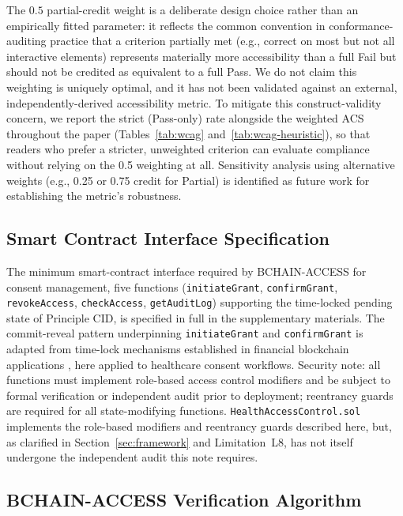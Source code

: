 \documentclass[journal,onecolumn]{IEEEtran}
\begin{document}
The $0.5$ partial-credit weight is a deliberate design choice rather than an empirically fitted parameter: it reflects the common convention in conformance-auditing practice that a criterion partially met (e.g., correct on most but not all interactive elements) represents materially more accessibility than a full Fail but should not be credited as equivalent to a full Pass. We do not claim this weighting is uniquely optimal, and it has not been validated against an external, independently-derived accessibility metric. To mitigate this construct-validity concern, we report the strict (Pass-only) rate alongside the weighted ACS throughout the paper (Tables~\ref{tab:wcag} and~\ref{tab:wcag-heuristic}), so that readers who prefer a stricter, unweighted criterion can evaluate compliance without relying on the 0.5 weighting at all. Sensitivity analysis using alternative weights (e.g., 0.25 or 0.75 credit for Partial) is identified as future work for establishing the metric's robustness.


\subsection{Smart Contract Interface Specification}

The minimum smart-contract interface required by BCHAIN-ACCESS for consent management, five functions (\texttt{initiateGrant}, \texttt{confirmGrant}, \texttt{revokeAccess}, \texttt{checkAccess}, \texttt{getAuditLog}) supporting the time-locked pending state of Principle CID, is specified in full in the supplementary materials. The commit-reveal pattern underpinning \texttt{initiateGrant} and \texttt{confirmGrant} is adapted from time-lock mechanisms established in financial blockchain applications \cite{buterin2014ethereum}, here applied to healthcare consent workflows. Security note: all functions must implement role-based access control modifiers and be subject to formal verification or independent audit prior to deployment; reentrancy guards are required for all state-modifying functions. \texttt{HealthAccessControl.sol} implements the role-based modifiers and reentrancy guards described here, but, as clarified in Section~\ref{sec:framework} and Limitation~L8, has not itself undergone the independent audit this note requires.




\subsection{BCHAIN-ACCESS Verification Algorithm}
\end{document}
